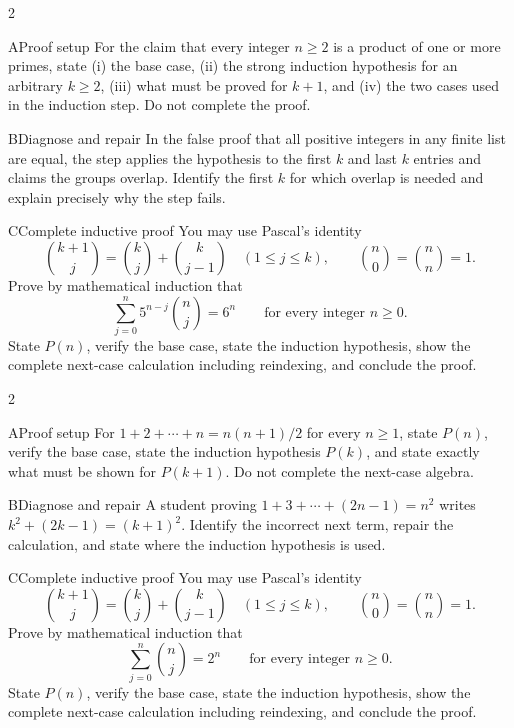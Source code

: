 \documentclass[9pt]{extarticle}
\begin{document}
\CoreWorkArea
\FormBreak
{}
\begin{multicols}{2}
\begin{CompactCoreProblem}{A}{Proof setup}
For the claim that every integer $n\ge2$ is a product of one or more primes, state (i) the base case, (ii) the strong induction hypothesis for an arbitrary $k\ge2$, (iii) what must be proved for $k+1$, and (iv) the two cases used in the induction step. Do not complete the proof.
\end{CompactCoreProblem}
\begin{CompactCoreProblem}{B}{Diagnose and repair}
In the false proof that all positive integers in any finite list are equal, the step applies the hypothesis to the first $k$ and last $k$ entries and claims the groups overlap. Identify the first $k$ for which overlap is needed and explain precisely why the step fails.
\end{CompactCoreProblem}
\end{multicols}
\begin{CompactCoreProblem}{C}{Complete inductive proof}
You may use Pascal's identity
\[
\binom{k+1}{j}=\binom{k}{j}+\binom{k}{j-1}
\quad(1\le j\le k),\qquad
\binom{n}{0}=\binom{n}{n}=1.
\]
Prove by mathematical induction that
\[
\sum_{j=0}^{n} 5^{n-j}\binom{n}{j}=6^n\qquad\text{for every integer }n\ge0.
\]
State $P(n)$, verify the base case, state the induction hypothesis, show the complete next-case calculation including reindexing, and conclude the proof.
\end{CompactCoreProblem}
\CoreWorkArea
\FormBreak
{}
\begin{multicols}{2}
\begin{CompactCoreProblem}{A}{Proof setup}
For $1+2+\cdots+n=n(n+1)/2$ for every $n\ge1$, state $P(n)$, verify the base case, state the induction hypothesis $P(k)$, and state exactly what must be shown for $P(k+1)$. Do not complete the next-case algebra.
\end{CompactCoreProblem}
\begin{CompactCoreProblem}{B}{Diagnose and repair}
A student proving $1+3+\cdots+(2n-1)=n^2$ writes $k^2+(2k-1)=(k+1)^2$. Identify the incorrect next term, repair the calculation, and state where the induction hypothesis is used.
\end{CompactCoreProblem}
\end{multicols}
\begin{CompactCoreProblem}{C}{Complete inductive proof}
You may use Pascal's identity
\[
\binom{k+1}{j}=\binom{k}{j}+\binom{k}{j-1}
\quad(1\le j\le k),\qquad
\binom{n}{0}=\binom{n}{n}=1.
\]
Prove by mathematical induction that
\[
\sum_{j=0}^{n}\binom{n}{j}=2^n\qquad\text{for every integer }n\ge0.
\]
State $P(n)$, verify the base case, state the induction hypothesis, show the complete next-case calculation including reindexing, and conclude the proof.
\end{CompactCoreProblem}
\end{document}
